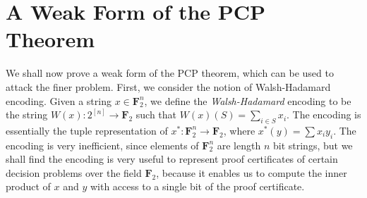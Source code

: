 \section{A Weak Form of the PCP Theorem}

We shall now prove a weak form of the PCP theorem, which can be used to attack the finer problem. First, we consider the notion of Walsh-Hadamard encoding. Given a string $x \in \mathbf{F}_2^n$, we define the \emph{Walsh-Hadamard} encoding to be the string $W(x): 2^{[n]} \to \mathbf{F}_2$ such that $W(x)(S) = \sum_{i \in S} x_i$. The encoding is essentially the tuple representation of $x^*: \mathbf{F}_2^n \to \mathbf{F}_2$, where $x^*(y) = \sum x_i y_i$. The encoding is very inefficient, since elements of $\mathbf{F}_2^n$ are length $n$ bit strings, but we shall find the encoding is very useful to represent proof certificates of certain decision problems over the field $\mathbf{F}_2$, because it enables us to compute the inner product of $x$ and $y$ with access to a single bit of the proof certificate.

